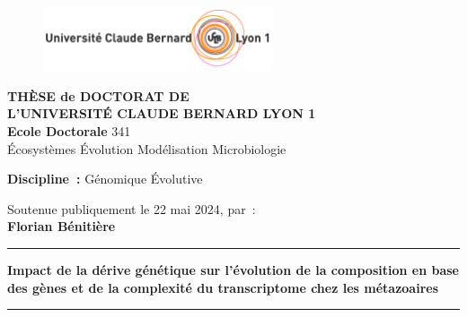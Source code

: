 \thispagestyle{empty}

\unitlength 1cm
\begin{center}

    \vspace*{-2.5cm}
    \begin{figure}[h]
        \centering
        \includegraphics[width=0.6\textwidth]{figures/logo-UdL-UCB}
    \end{figure}
    \vspace*{0.5cm}

    {\large \textbf{THÈSE de DOCTORAT DE\\L'UNIVERSITÉ CLAUDE BERNARD LYON 1}\\}
    \vspace{12pt}
    {\large \textbf{Ecole Doctorale} 341 \\
    \vspace{0.15cm}
    Écosystèmes Évolution Modélisation Microbiologie
    }
    
    \vspace{12pt}

    {\large \textbf{Discipline~:} Génomique Évolutive
    \\}

    \vspace{0.8cm}

    {Soutenue publiquement le 22 mai 2024, par~:\\}
    \vspace{0.15cm}
    {\large \textbf{Florian Bénitière}}
    \vspace{0.5cm}

    \vspace{16pt}
    \rule{7cm}{1pt}
    
    \vspace{10pt}
    
    {\LARGE \textbf{Impact de la dérive génétique sur l'évolution de la composition en base des gènes et de la complexité du transcriptome chez les métazoaires}\par}
        

    \vspace{10pt}
    \rule{7cm}{1pt}
    \vspace{16pt}

    \vspace{0.5cm}

\end{center}

